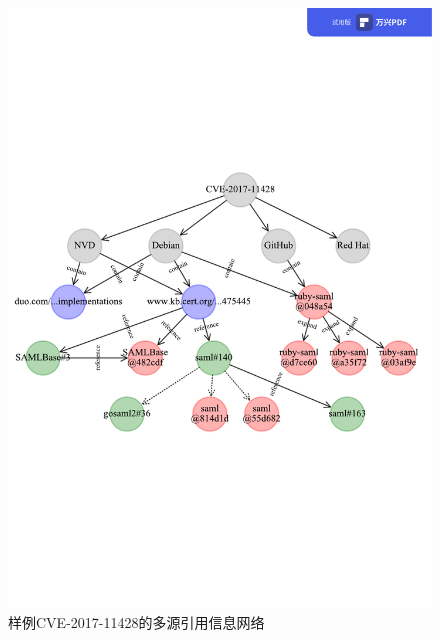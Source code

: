 \begin{figure}[h]
    \centering
    \includegraphics[scale=0.68]{res/network-example.pdf}
    \caption{样例CVE-2017-11428的多源引用信息网络}\label{fig:example}
\end{figure}

